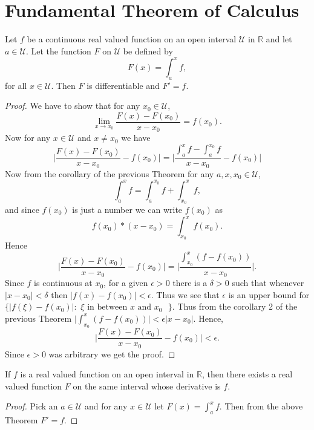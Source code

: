 \section{Fundamental Theorem of Calculus}
\begin{Theorem}[name=Fundamental Theorem of calculus]
    Let $f$ be a continuous real valued function on an open interval $\mathcal{U}$ in $\mathbb{R}$
    and let $a \in \mathcal{U}$. Let the function $F$ on $\mathcal{U}$ be defined by 
    \[F(x) = \int_a^x f,\] for all $x \in \mathcal{U}$. Then $F$ is differentiable and $F' =
    f$. 
\end{Theorem}
\begin{proof}
 We have to show that for any $x_0 \in
    \mathcal{U}$,
    \[ \lim_{x \to x_0} \frac{F(x) - F(x_0)}{x - x_0} = f(x_0) .\] 
    Now for any $x \in \mathcal{U}$ and $x \neq x_0$ we have
    \begin{displaymath}
	\left.\lvert \frac{F(x) - F(x_0)}{x - x_0} - f(x_0)\rvert\right. = \left.\lvert \frac{\int_a^x f -
	    \int_a^{x_0}f}{x - x_0} - f(x_0) \rvert\right.
    \end{displaymath}
    Now from the corollary of the previous Theorem for any $a,x,x_0 \in \mathcal{U}$,
    \[ \int_a^x f = \int_a^{x_0} f + \int_{x_0}^{x} f ,\]
    and since $f(x_0)$ is just a number we can write $f(x_0)$ as 
    \[ f(x_0)*(x - x_0) = \int_{x_0}^x f(x_0) .\] Hence
    \[\left.\lvert \frac{F(x) - F(x_0)}{x - x_0} - f(x_0)\rvert \right. = \left.\lvert
	    \frac{\int_{x_0}^x (f - f(x_0))}{x -x_0}\rvert \right. .\]
     Since $f$ is continuous at $x_0$, for a given $\epsilon > 0 $ there is a $\delta > 0$ such that 
     whenever $\lvert x - x_0 \rvert < \delta$ then $\lvert f(x) - f(x_0) \rvert < \epsilon$. Thus
     we see that $\epsilon $ is an upper bound for $\lbrace \lvert f(\xi) - f(x_0) \rvert : \text{
	 $\xi$ in between $x$ and $x_0$ } \rbrace.$ Thus from the corollary 2 of the previous
     Theorem $\lvert \int_{x_0}^x (f - f(x_0)) \rvert < \epsilon \lvert x - x_0 \rvert$. Hence,
     \[\left.\lvert \frac{F(x) - F(x_0)}{x - x_0} - f(x_0)\rvert\right. < \epsilon .\] Since
     $\epsilon > 0$ was arbitrary we get the proof.
\end{proof}
\begin{Corollary}
    If $f$ is a real valued function on an open interval in $\mathbb{R}$, then there exists a real
    valued function $F$ on the same interval whose derivative is $f$. 
\end{Corollary}
\begin{proof}
    Pick an $a \in \mathcal{U}$ and for any $x \in \mathcal{U}$ let $F(x) = \int_a^x f $. Then from
    the above Theorem $F' = f$.
\end{proof}
